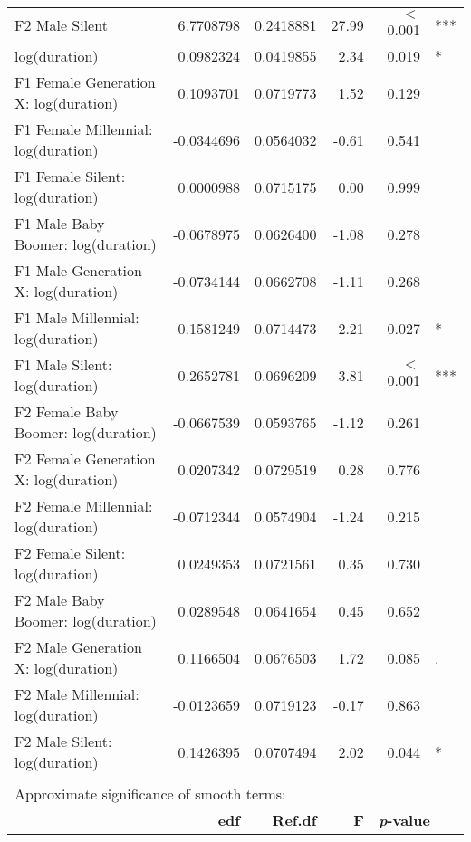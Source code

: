 \begin{table}[ht]
{{\begin{tabular}{l r r r r@{\hskip1pt} @{\hskip0pt}l}
{}F2 Male Silent               &  6.7708798 & 0.2418881 &  27.99 &  $<$ 0.001 & *** \\
log(duration)                                        &  0.0982324 & 0.0419855 &   2.34 &      0.019 & *   \\
{}F1 Female Generation X: log(duration)        &  0.1093701 & 0.0719773 &   1.52 &      0.129 &     \\
{}F1 Female Millennial: log(duration)  & -0.0344696 & 0.0564032 &  -0.61 &      0.541 &     \\
{}F1 Female Silent: log(duration)      &  0.0000988 & 0.0715175 &   0.00 &      0.999 &     \\
{}F1 Male Baby Boomer: log(duration)      & -0.0678975 & 0.0626400 &  -1.08 &      0.278 &     \\
{}F1 Male Generation X: log(duration)        & -0.0734144 & 0.0662708 &  -1.11 &      0.268 &     \\
{}F1 Male Millennial: log(duration)  &  0.1581249 & 0.0714473 &   2.21 &      0.027 & *   \\
{}F1 Male Silent: log(duration)      & -0.2652781 & 0.0696209 &  -3.81 &  $<$ 0.001 & *** \\
{}F2 Female Baby Boomer: log(duration)      & -0.0667539 & 0.0593765 &  -1.12 &      0.261 &     \\
{}F2 Female Generation X: log(duration)        &  0.0207342 & 0.0729519 &   0.28 &      0.776 &     \\
{}F2 Female Millennial: log(duration)  & -0.0712344 & 0.0574904 &  -1.24 &      0.215 &     \\
{}F2 Female Silent: log(duration)      &  0.0249353 & 0.0721561 &   0.35 &      0.730 &     \\
{}F2 Male Baby Boomer: log(duration)      &  0.0289548 & 0.0641654 &   0.45 &      0.652 &     \\
{}F2 Male Generation X: log(duration)        &  0.1166504 & 0.0676503 &   1.72 &      0.085 & .   \\
{}F2 Male Millennial: log(duration)  & -0.0123659 & 0.0719123 &  -0.17 &      0.863 &     \\
{}F2 Male Silent: log(duration)      &  0.1426395 & 0.0707494 &   2.02 &      0.044 & *   \\
\\
\multicolumn{6}{l}{Approximate significance of smooth terms:}\\
 & \textbf{edf} & \textbf{Ref.df} & \textbf{F} & \multicolumn{2}{l}{\textbf{\textit{p}-value}}\\

\end{tabular}}}
\end{table}
